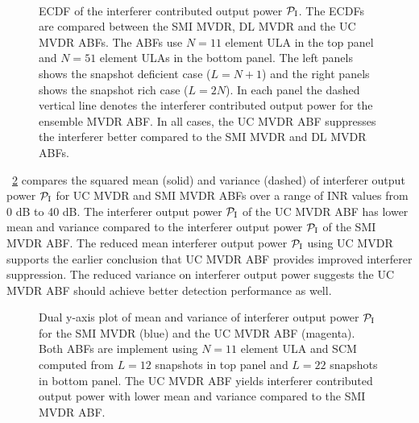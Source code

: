 \begin{figure}[!hp]
  \centering
  \\
  \vfill
  \caption[Comparison of the ECDF of the interferer contributed output
  power.]{ ECDF of the interferer contributed output power
    $\mathcal{P}_{\rm I}$. The ECDFs are compared between the SMI MVDR, DL MVDR
    and the UC MVDR ABFs. The ABFs use $N = 11$ element ULA in the top
    panel and $N = 51$ element ULAs in the bottom panel. The left
    panels shows the snapshot deficient case ($L = N + 1$) and the
    right panels shows the snapshot rich case ($L = 2N$). In each
    panel the dashed vertical line denotes the interferer contributed
    output power for the ensemble MVDR ABF. In all cases, the UC MVDR
    ABF suppresses the interferer better compared to the SMI MVDR and
    DL MVDR ABFs.}
  \label{fig:ecdf-plots}
\end{figure}

\figurename{}~\ref{fig:pout-mean-var-plots} compares the squared mean
(solid) and variance (dashed) of interferer output power $\mathcal{P}_{\rm I}$ for
UC MVDR and SMI MVDR ABFs over a range of INR values from 0 dB to 40
dB. The interferer output power $\mathcal{P}_{\rm I}$ of the UC MVDR ABF has lower
mean and variance compared to the interferer output power $\mathcal{P}_{\rm I}$ of
the SMI MVDR ABF. The reduced mean interferer output power $\mathcal{P}_{\rm I}$
using UC MVDR supports the earlier conclusion that UC MVDR ABF
provides improved interferer suppression. The reduced variance on
interferer output power suggests the UC MVDR ABF should achieve better
detection performance as well.

\begin{figure*}[!hp]
  \centering
    \hfill
  \caption{Dual y-axis plot of mean and variance of interferer output power $\mathcal{P}_{\rm I}$ for the SMI MVDR (blue) and the UC MVDR ABF (magenta). Both ABFs are implement using $N = 11$ element ULA and SCM computed from $L = 12$ snapshots in top panel and $L = 22$ snapshots in bottom panel. The UC MVDR ABF yields interferer contributed output power with lower mean and variance compared to the SMI MVDR ABF.}
  \label{fig:pout-mean-var-plots}
\end{figure*}

